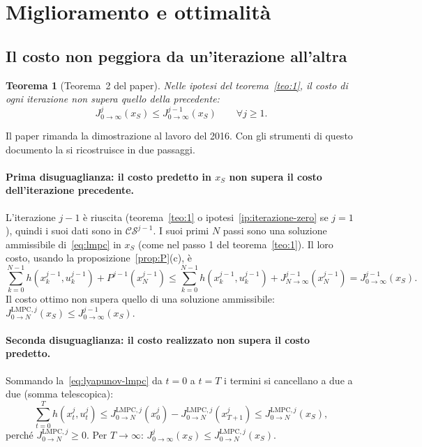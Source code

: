 \documentclass[11pt,a4paper]{article}
\theoremstyle{definition}
\theoremstyle{plain}
\newtheorem{teorema}[definizione]{Teorema}
\theoremstyle{remark}
\newcommand{\CS}{\mathcal{CS}}
\newcommand{\JL}{J^{\mathrm{LMPC},j}_{0\to N}}
\begin{document}
\section{Miglioramento e ottimalità}\label{sec:convergenza}

\subsection{Il costo non peggiora da un'iterazione all'altra}

\begin{teorema}[Teorema~2 del paper]\label{teo:2}
Nelle ipotesi del teorema~\ref{teo:1}, il costo di ogni iterazione non
supera quello della precedente:
\[
  J^{j}_{0\to\infty}(x_S)\le J^{j-1}_{0\to\infty}(x_S)\qquad\forall j\ge 1.
\]
\end{teorema}

Il paper rimanda la dimostrazione al lavoro del 2016. Con gli strumenti di
questo documento la si ricostruisce in due passaggi.

\paragraph{Prima disuguaglianza: il costo predetto in $x_S$ non supera il costo dell'iterazione precedente.}
L'iterazione $j-1$ è riuscita (teorema~\ref{teo:1} o ipotesi~\ref{ip:iterazione-zero}
se $j=1$), quindi i suoi dati sono in $\CS^{j-1}$. I suoi primi $N$ passi sono
una soluzione ammissibile di~\eqref{eq:lmpc} in $x_S$ (come nel passo 1 del
teorema~\ref{teo:1}). Il loro costo, usando la proposizione~\ref{prop:P}(c), è
\[
  \sum_{k=0}^{N-1}h(x^{j-1}_k,u^{j-1}_k) + P^{j-1}(x^{j-1}_N)
  \le \sum_{k=0}^{N-1}h(x^{j-1}_k,u^{j-1}_k) + J^{j-1}_{N\to\infty}(x^{j-1}_N)
  = J^{j-1}_{0\to\infty}(x_S).
\]
Il costo ottimo non supera quello di una soluzione ammissibile:
$\JL(x_S)\le J^{j-1}_{0\to\infty}(x_S)$.

\paragraph{Seconda disuguaglianza: il costo realizzato non supera il costo predetto.}
Sommando la~\eqref{eq:lyapunov-lmpc} da $t=0$ a $t=T$ i termini si
cancellano a due a due (somma telescopica):
\[
  \sum_{t=0}^{T}h(x^j_t,u^j_t) \le \JL(x^j_0) - \JL(x^j_{T+1}) \le \JL(x_S),
\]
perché $\JL\ge 0$. Per $T\to\infty$: $J^j_{0\to\infty}(x_S)\le\JL(x_S)$.
\end{document}
